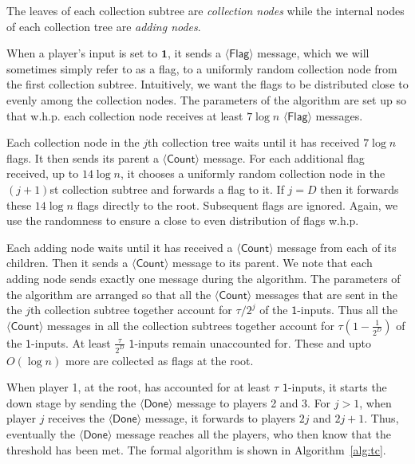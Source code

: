 \documentclass[10pt]{llncs}
\newcommand{\whp}{w.h.p.\xspace}
\newcommand{\dcl}{D}
\newcommand{\flag}{$\langle\mathsf{Flag}\rangle$\xspace}
\newcommand{\countm}{$\langle\mathsf{Count}\rangle$\xspace}
\newcommand{\done}{$\langle\mathsf{Done}\rangle$\xspace}
\newcommand{\oneinputs}{$\mathsf{1}$-inputs\xspace}
\begin{document}
The leaves of each collection subtree are \emph{collection nodes} 
while the internal nodes of each collection tree are
\emph{adding nodes}. 

When a player's input is set to $\mathbf{1}$, it sends a 
\flag message, which we will sometimes simply refer to as a flag, 
to a uniformly random collection node from the first collection subtree. 
Intuitively, we want the flags to be distributed close to evenly among 
the collection nodes.
The parameters of the algorithm are set up so that \whp each 
collection node receives at least $7\log{n}$ \flag messages.

Each collection node in the $j$th collection tree waits until it has 
received $7\log{n}$ flags.
It then sends its parent a \countm message. For each additional flag 
received,  up to $14 \log n$, it chooses a uniformly random collection 
node in the $(j+1)$st collection subtree and forwards a flag 
to it. If $j = \dcl$ then it forwards these $14\log{n}$ flags 
directly to the root.
Subsequent flags are ignored. Again, we use the randomness to 
ensure a close to even distribution of flags \whp

Each adding node waits until it has received a \countm 
message from each of its children. Then it sends a \countm message 
to its parent. We note that
each adding node sends exactly one message during the algorithm. 
The parameters of the algorithm are arranged so that all the \countm 
messages that are sent in the the $j$th collection subtree together account 
for $\tau/2^j$ of the \oneinputs. Thus all the \countm messages in all the 
collection subtrees together account for $\tau \left(1-\frac1{2^{\dcl}}\right)$ 
of the \oneinputs. At least $\frac{\tau}{2^{\dcl}}$ \oneinputs 
remain unaccounted for. These and upto $O(\log{n})$ more are collected 
as flags at the root.

When player 1, at the root,  has accounted for at least $\tau$ 
\oneinputs, it starts the down stage by sending the \done message 
to players 2 and 3. For $j>1$, when player $j$ receives the \done message, 
it forwards to players $2j$ and $2j +1$. Thus, eventually the  \done
message reaches all the players, who then know that the threshold 
has been met. The formal algorithm is shown in Algorithm~\ref{alg:tc}.
\end{document}
